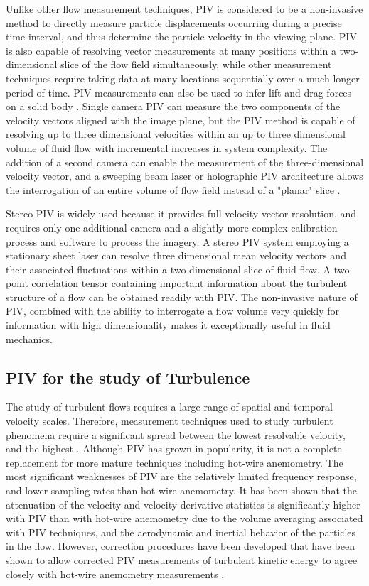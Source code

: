Unlike other flow measurement techniques, PIV is considered to be a 
non-invasive method to directly measure particle displacements occurring during 
a precise time interval, and thus determine the particle velocity in the 
viewing plane. PIV is also capable 
of resolving vector measurements at many positions within a two-dimensional 
slice of the flow field simultaneously, while other measurement techniques 
require taking data at many locations sequentially over a much longer period 
of time. PIV measurements can also be used to infer lift and drag forces on a 
solid body \cite{noca1997}. Single camera PIV can measure the two components of 
the velocity vectors aligned with the image plane, but the PIV method is 
capable of resolving up to three dimensional velocities within an up to three 
dimensional volume of fluid flow with incremental increases 
in system complexity. The addition of a second camera can enable the 
measurement of the three-dimensional velocity vector, and a sweeping beam laser 
or holographic PIV architecture allows the interrogation of an entire volume of 
flow field instead of a "planar" slice 
\cite{barnhart1994,elsinga2006,kahler2000}.

Stereo PIV is widely used because it provides full velocity vector resolution, 
and requires only one additional camera and a slightly more complex 
calibration process and software to process the imagery. A stereo PIV system 
employing a  stationary sheet laser can resolve three dimensional mean velocity 
vectors and their associated fluctuations within a two dimensional slice of 
fluid flow. A 
two point correlation tensor containing important information about the 
turbulent structure of a flow can be obtained readily with PIV. The 
non-invasive nature of PIV, combined with the  ability to interrogate a flow 
volume very quickly for information with high dimensionality makes it 
exceptionally useful in fluid mechanics. \cite{adrian1991}

\subsection{PIV for the study of Turbulence}
The study of turbulent flows requires a large range of spatial and temporal 
velocity scales. Therefore, measurement techniques used to study turbulent 
phenomena require a significant spread between the lowest resolvable velocity, 
and the highest \cite{barnhart1994}. Although PIV has grown in popularity, it 
is not a complete replacement for more mature techniques including hot-wire 
anemometry. The most significant weaknesses of PIV are the relatively limited 
frequency response, and lower sampling rates than hot-wire anemometry.
It has been shown that the attenuation of the velocity and velocity derivative 
statistics is significantly higher with PIV than with hot-wire anemometry due 
to the volume averaging associated with PIV techniques, and the aerodynamic and 
inertial behavior of the particles in the flow.
However, correction procedures have been developed that have been shown to 
allow corrected PIV measurements of turbulent kinetic energy to agree closely 
with hot-wire anemometry measurements \cite{lavoie2007,kasagi1991}. 

